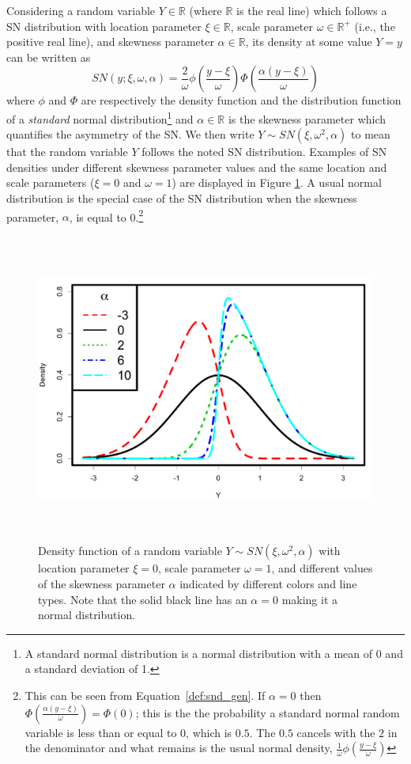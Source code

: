 \documentclass[11pt, oneside]{article}
\begin{document}
Considering a random variable $Y\in \mathbb R$ (where $\mathbb R$ is the real line) which follows a SN distribution with location parameter $\xi \in \mathbb R$, scale parameter $\omega \in \mathbb R^{+}$ (i.e., the positive real line), and skewness parameter $\alpha \in \mathbb R$, its density at some value $Y = y$ can be written as 
\begin{equation} \label{def:snd_gen}
SN(y;\xi, \omega, \alpha) = \frac{2}{\omega} \phi\left(\frac{y-\xi}{\omega}\right) \Phi\left(\frac{\alpha(y-\xi)}{\omega}\right)
\end{equation}
where $\phi$ and $\Phi$ are respectively the density function and the distribution function of a \emph{standard} normal distribution\footnote{A standard normal distribution is a normal distribution with a mean of 0 and a standard deviation of 1.}
 and $\alpha \in \mathbb R$ is the skewness parameter which quantifies the asymmetry of the SN.  We then write $Y \sim SN(\xi, \omega^{2}, \alpha)$ to mean that the random variable $Y$ follows the noted SN distribution.
Examples of SN densities under different skewness parameter values and the same location and scale parameters ($\xi = 0$ and $\omega = 1$) are displayed in Figure \ref{fig:SN.plot}.  A usual normal distribution is the special case of the SN distribution when the skewness parameter, $\alpha$, is equal to 0.\footnote{This can be seen from Equation~\eqref{def:snd_gen}.  If $\alpha = 0$ then $\Phi\left(\frac{\alpha(y-\xi)}{\omega}\right) = \Phi(0)$; this is the the probability a standard normal random variable is less than or equal to 0, which is $0.5$.  The $0.5$ cancels with the $2$ in the denominator and what remains is the usual normal density, $\frac{1}{\omega} \phi\left(\frac{y-\xi}{\omega}\right)$}
%
\begin{figure}[htbp]
   \centering
\includegraphics[height = 4in]{Skew_normal_densities_jjck.pdf} 
   \caption{Density function of a random variable $Y \sim SN(\xi, \omega^{2}, \alpha)$ with location parameter $\xi = 0$, scale parameter $\omega = 1$, and different values of the skewness parameter $\alpha$ indicated by different colors and line types.
Note that the solid black line has an $\alpha = 0$ making it a normal distribution.   
   }
   \label{fig:SN.plot}
\end{figure}
\end{document}
